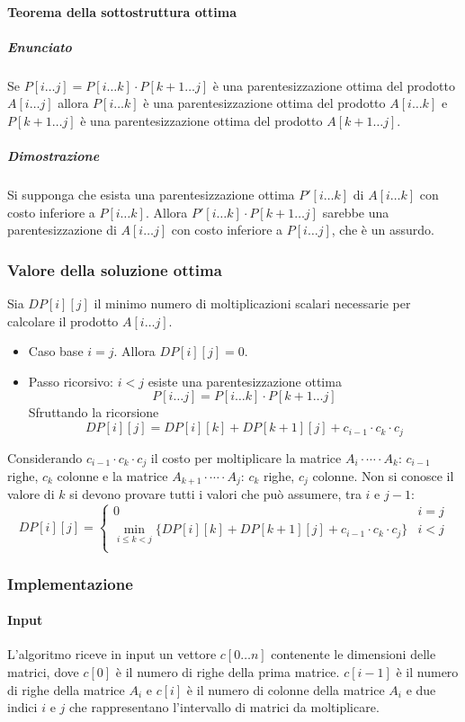 			\paragraph{Teorema della sottostruttura ottima}
			\subparagraph{Enunciato}
			Se $P[i\dots j]=P[i\dots k]\cdot P[k+1\dots j]$ \`e una parentesizzazione ottima del prodotto $A[i\dots j]$ allora $P[i\dots k]$ \`e una parentesizzazione
			ottima del prodotto $A[i\dots k]$ e $P[k+1\dots j]$ \`e una parentesizzazione ottima del prodotto $A[k+1\dots j]$. 
			\subparagraph{Dimostrazione}
			Si supponga che esista una parentesizzazione ottima $P'[i\dots k]$ di $A[i\dots k]$ con costo inferiore a $P[i\dots k]$. Allora $P'[i\dots k]\cdot 
			P[k+1\dots j]$ sarebbe una parentesizzazione di $A[i\dots j]$ con costo inferiore a $P[i\dots j]$, che \`e un assurdo. 
		\subsubsection{Valore della soluzione ottima}
			Sia $DP[i][j]$ il minimo numero di moltiplicazioni scalari necessarie per calcolare il prodotto $A[i\dots j]$. 
			\begin{itemize}
				\item Caso base $i=j$. Allora $DP[i][j]=0$.
				\item Passo ricorsivo: $i<j$ esiste una parentesizzazione ottima $$P[i\dots j] = P[i\dots k]\cdot P[k+1\dots j]$$ Sfruttando la ricorsione 
					$$DP[i][j] = DP[i][k]+DP[k+1][j]+c_{i-1}\cdot c_k\cdot c_j$$
			\end{itemize}
			Considerando $c_{i-1}\cdot c_k\cdot c_j$ il costo per moltiplicare la matrice $A_i\cdot\cdots\cdot A_k$: $c_{i-1}$ righe, $c_k$ colonne e la matrice $A_{k+1}\cdot\cdots\cdot A_j$:
			$c_k$ righe, $c_j$ colonne. Non si conosce il valore di $k$ si devono provare tutti i valori che pu\`o assumere, tra $i$ e $j-1$:
			$$DP[i][j] = \begin{cases}
				0 & i = j\\
				\min\limits_{i\le k < j}\{DP[i][k]+DP[k+1][j]+c_{i-1}\cdot c_k\cdot c_j\} & i < j\\
			\end{cases}$$
		\subsubsection{Implementazione}
			\paragraph{Input}
			L'algoritmo riceve in input un vettore $c[0\dots n]$ contenente le dimensioni delle matrici, dove $c[0]$ \`e il numero di righe della prima matrice. $c[i-1]$ \`e il numero di righe 
			della matrice $A_i$ e $c[i]$ \`e il numero di colonne della matrice $A_i$ e due indici $i$ e $j$ che rappresentano l'intervallo di matrici da moltiplicare. 
